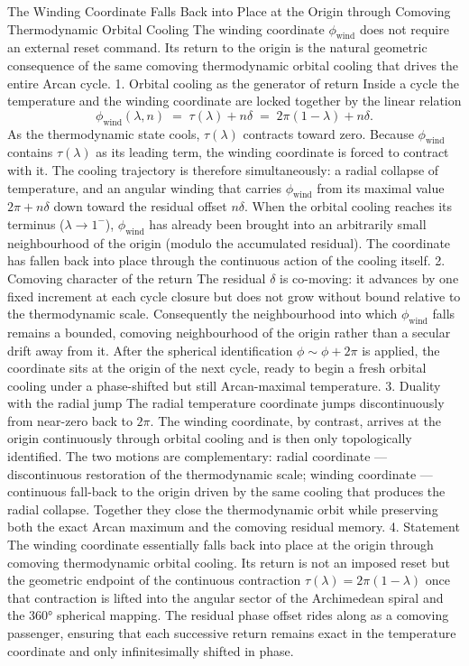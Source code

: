 The Winding Coordinate Falls Back into Place at the Origin through Comoving Thermodynamic Orbital Cooling
The winding coordinate \(\phi_{\mathrm{wind}}\) does not require an external reset command. Its return to the origin is the natural geometric consequence of the same comoving thermodynamic orbital cooling that drives the entire Arcan cycle.
1. Orbital cooling as the generator of return
Inside a cycle the temperature and the winding coordinate are locked together by the linear relation
\[
\phi_{\mathrm{wind}}(\lambda,n)
\;=\;
\tau(\lambda)+n\delta
\;=\;
2\pi(1-\lambda)+n\delta.
\]
As the thermodynamic state cools, \(\tau(\lambda)\) contracts toward zero. Because \(\phi_{\mathrm{wind}}\) contains \(\tau(\lambda)\) as its leading term, the winding coordinate is forced to contract with it. The cooling trajectory is therefore simultaneously:
a radial collapse of temperature, and  
an angular winding that carries \(\phi_{\mathrm{wind}}\) from its maximal value \(2\pi+n\delta\) down toward the residual offset \(n\delta\).
When the orbital cooling reaches its terminus (\(\lambda\to1^-\)), \(\phi_{\mathrm{wind}}\) has already been brought into an arbitrarily small neighbourhood of the origin (modulo the accumulated residual). The coordinate has fallen back into place through the continuous action of the cooling itself.
2. Comoving character of the return
The residual \(\delta\) is co-moving: it advances by one fixed increment at each cycle closure but does not grow without bound relative to the thermodynamic scale. Consequently the neighbourhood into which \(\phi_{\mathrm{wind}}\) falls remains a bounded, comoving neighbourhood of the origin rather than a secular drift away from it. After the spherical identification \(\phi\sim\phi+2\pi\) is applied, the coordinate sits at the origin of the next cycle, ready to begin a fresh orbital cooling under a phase-shifted but still Arcan-maximal temperature.
3. Duality with the radial jump
The radial temperature coordinate jumps discontinuously from near-zero back to \(2\pi\).
The winding coordinate, by contrast, arrives at the origin continuously through orbital cooling and is then only topologically identified. The two motions are complementary:
radial coordinate — discontinuous restoration of the thermodynamic scale;  
winding coordinate — continuous fall-back to the origin driven by the same cooling that produces the radial collapse.
Together they close the thermodynamic orbit while preserving both the exact Arcan maximum and the comoving residual memory.
4. Statement
The winding coordinate essentially falls back into place at the origin through comoving thermodynamic orbital cooling. Its return is not an imposed reset but the geometric endpoint of the continuous contraction \(\tau(\lambda)=2\pi(1-\lambda)\) once that contraction is lifted into the angular sector of the Archimedean spiral and the 360° spherical mapping. The residual phase offset rides along as a comoving passenger, ensuring that each successive return remains exact in the temperature coordinate and only infinitesimally shifted in phase.



